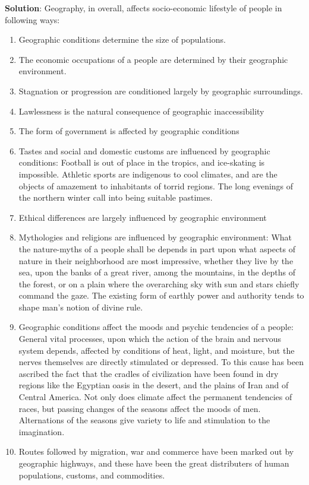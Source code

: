 \documentclass[
  openany]{book}
\newenvironment{solution}{ {\bfseries Solution}:}{}
\begin{document}
\begin{questions}
\begin{solution}
Geography, in overall, affects socio-economic lifestyle of people in following ways:

\begin{enumerate}
\item Geographic conditions determine the size of populations.
\item The economic occupations of a people are determined by their geographic environment.
\item Stagnation or progression are conditioned largely by geographic surroundings.
\item Lawlessness is the natural consequence of geographic inaccessibility
\item The form of government is affected by geographic conditions
\item Tastes and social and domestic customs are influenced by geographic conditions: Football is out of place in the tropics, and ice-skating is impossible. Athletic sports are indigenous to cool climates, and are the objects of amazement to inhabitants of torrid regions. The long evenings of the northern winter call into being suitable pastimes.
\item Ethical differences are largely influenced by geographic environment
\item Mythologies and religions are influenced by geographic environment: What the nature-myths of a people shall be depends in part upon what aspects of nature in their neighborhood are most impressive, whether they live by the sea, upon the banks of a great river, among the mountains, in the depths of the forest, or on a plain where the overarching sky with sun and stars chiefly command the gaze. The existing form of earthly power and authority tends to shape man's notion of divine rule.
\item Geographic conditions affect the moods and psychic tendencies of a people: General vital processes, upon which the action of the brain and nervous system depends, affected by conditions of heat, light, and moisture, but the nerves themselves are directly stimulated or depressed. To this cause has been ascribed the fact that the cradles of civilization have been found in dry regions like the Egyptian oasis in the desert, and the plains of Iran and of Central America. Not only does climate affect the permanent tendencies of races, but passing changes of the seasons affect the moods of men. Alternations of the seasons give variety to life and stimulation to the imagination.
\item Routes followed by migration, war and commerce have been marked out by geographic highways, and these have been the great distributers of human populations, customs, and commodities.
\end{enumerate}


\end{solution}
\end{questions}
\end{document}
